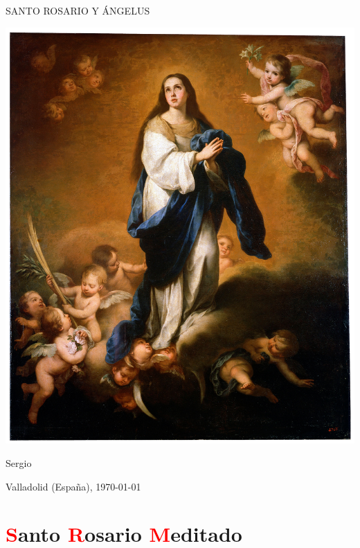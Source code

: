 \documentclass[10pt,twoside]{book}
\begin{document}
\begin{titlepage}
      \begin{center}

            \vspace*{10em}

            {\Huge \uppercase{Santo Rosario y Ángelus}}

            \vspace{1.5em}

            {\includegraphics[scale=0.95]{foto-04.jpg}}

            \vspace{0.5em}

            Sergio

            Valladolid (España), \monthyeardate\today
      \end{center}
\end{titlepage}

\chapter*{\centering\textcolor{red}{S}anto \textcolor{red}{R}osario \textcolor{red}{M}editado}
\end{document}
